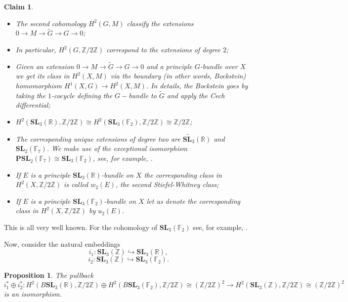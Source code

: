 \documentclass[a4paper]{article}
\newtheorem{Prop}[Thm]{Proposition}
\newtheorem{Cla}[Thm]{Claim}
\newcommand{\embeds}{\hookrightarrow}
\newcommand{\SL}{\mathbf{SL}_3(\mathbb{Z})}        %
\begin{document}
\begin{Cla}
\begin{itemize}
	\item The second cohomology $H^2(G, M)$ classify the extensions $0 \to M \to \tilde G \to G \to 0$;
	\item In particular, $H^2(G, \mathbb{Z}/2\mathbb{Z})$ correspond to the extensions of degree $2$;
\item Given an extension $0 \to M \to \tilde G \to G \to 0$ and a principle $G$-bundle over $X$ we get its class in $H^2(X, M)$ via the boundary (in other words, Bockstein) homomorphism $H^1(X, G) \to H^2(X, M)$.  In details, the Bockstein goes by taking the $1$-cocycle defining the $G-$bundle to $\tilde G$ and apply the Cech differential;
	\item $H^2( \mathbf{SL}_3(\mathbb{R}), \mathbb{Z}/ 2 \mathbb{Z}) \cong
	H^2( \mathbf{SL}_3(\mathbb{F}_2), \mathbb{Z}/ 2 \mathbb{Z}) \cong \mathbb{Z}/2\mathbb{Z}$;
\item The corresponding unique extensions of degree two are $\widetilde{\mathbf{SL}_3}(\mathbb{R})$ and $\mathbf{SL}_2(\mathbb{F}_7)$.
	We make use of the exceptional isomorphism $\mathbf{PSL}_2(\mathbb{F}_7) \cong \mathbf{SL}_3(\mathbb{F}_2)$, see, for example, \cite{merzon_psl_2_7_sl_3_2}.
\item If $E$ is a principle $\mathbf{SL}_3(\mathbb{R})$-bundle on $X$ the corresponding class in $H^2(X, \mathbb{Z}/ 2 \mathbb{Z})$ is called $w_2(E)$, the second Stiefel-Whitney class;
\item If $E$ is a principle $\mathbf{SL}_3(\mathbb{F}_2)$-bundle on $X$ let us denote the corresponding class in $H^2(X, \mathbb{Z}/ 2 \mathbb{Z})$ by $u_2(E)$.
\end{itemize}
\end{Cla}
This is all very well known.
For the cohomology of $\mathbf{SL}_3(\mathbb{F}_2)$ see, for example, \cite{adem2006lecturescohomologyfinitegroups}.

Now, consider the natural embeddings
\[
i_1: \SL \embeds {\mathbf{SL}_3(\mathbb{R})}
, \] 
\[
i_2: \SL \embeds {\mathbf{SL}_3(\mathbb{F}_2)}
.\] 

\begin{Prop}
The pullback 
\[
i_1^* \oplus i_2^*: 
H^2(B\mathbf{SL}_3(\mathbb{R}), \mathbb{Z}/ 2 \mathbb{Z}) \oplus
H^2(B\mathbf{SL}_3(\mathbb{F}_2), \mathbb{Z}/ 2 \mathbb{Z}) \cong (\mathbb{Z} / 2 \mathbb{Z})^2 \to 
H^2(\SL, \mathbb{Z}/ 2 \mathbb{Z}) \cong (\mathbb{Z}/2\mathbb{Z})^{2}
\] 
is an isomorphism.
\end{Prop}
\end{document}
